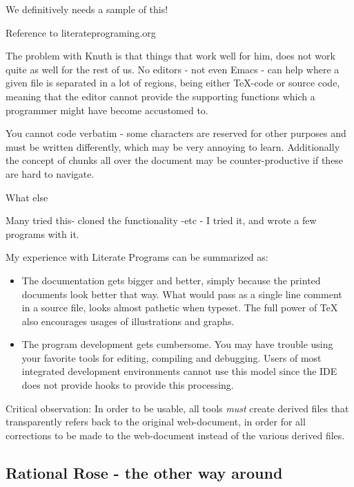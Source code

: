 \textsf{We definitively needs a sample of this!}

\textsf{Reference to literateprograming.org}

The problem with Knuth is that things that work well for him, does not
work quite as well for the rest of us.   No editors - not even Emacs -
can help where a given file is separated in a lot of regions, being 
either {\TeX}-code or source code, meaning that the editor cannot
provide the supporting functions which a programmer might have become
accustomed to.

You cannot code verbatim - some characters are reserved for other
purposes and must be written differently, which may be very annoying
to learn.  Additionally the concept of chunks all over the document
may be counter-productive if these are hard to navigate.

\textsf{What else}

\textsf{Many tried this- cloned the functionality -etc - I tried it,
  and wrote a few programs with it.}

My experience with Literate Programs can be summarized as:

\begin{itemize}
\item The documentation gets bigger and better, simply because the
printed documents look better that way.  What would pass as a single
line comment in a source file, looks almost pathetic when typeset.
The full power of {\TeX} also encourages usages of illustrations and
graphs.  

\item The program development gets cumbersome.  You may have trouble
  using your favorite tools for editing, compiling and debugging.
  Users of most integrated development environments cannot use this
  model since the IDE does not provide hooks to provide this processing.

\end{itemize}

Critical observation: In order to be usable, all tools \textit{must}
create derived files that transparently refers back to the original
web-document, in order for all corrections to be made to the
web-document instead of the various derived files.


\subsection{Rational Rose - the other way around}
\label{sec:rational-rose}

